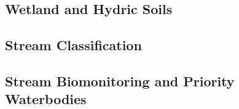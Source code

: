 \subsection{Wetland and Hydric Soils}
\label{subsec:wetland}
\subsection{Stream Classification}
\label{subsec:streamclass}
\subsection{Stream Biomonitoring and Priority Waterbodies}
\label{subsec:streambiomonitoring}
